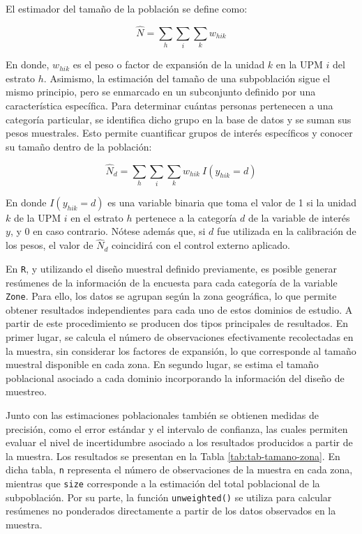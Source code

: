 \documentclass[
  spanish,
  12pt,
]{book}
\begin{document}
El estimador del tamaño de la población se define como:

\[
\hat{N} = \sum_{h} \sum_{i} \sum_{k} w_{hik}
\]

En donde, \(w_{hik}\) es el peso o factor de expansión de la unidad \(k\) en la UPM \(i\) del estrato \(h\). Asimismo, la estimación del tamaño de una subpoblación sigue el mismo principio, pero se enmarcado en un subconjunto definido por una característica específica. Para determinar cuántas personas pertenecen a una categoría particular, se identifica dicho grupo en la base de datos y se suman sus pesos muestrales. Esto permite cuantificar grupos de interés específicos y conocer su tamaño dentro de la población:

\[
\hat{N}_d = \sum_{h} \sum_{i} \sum_{k} w_{hik} \ I(y_{hik}=d)
\]

En donde \(I(y_{hik}=d)\) es una variable binaria que toma el valor de 1 si la unidad \(k\) de la UPM \(i\) en el estrato \(h\) pertenece a la categoría \(d\) de la variable de interés \(y\), y 0 en caso contrario. Nótese además que, si \(d\) fue utilizada en la calibración de los pesos, el valor de \(\hat{N}_d\) coincidirá con el control externo aplicado.

En \texttt{R}, y utilizando el diseño muestral definido previamente, es posible generar resúmenes de la información de la encuesta para cada categoría de la variable \texttt{Zone}. Para ello, los datos se agrupan según la zona geográfica, lo que permite obtener resultados independientes para cada uno de estos dominios de estudio. A partir de este procedimiento se producen dos tipos principales de resultados. En primer lugar, se calcula el número de observaciones efectivamente recolectadas en la muestra, sin considerar los factores de expansión, lo que corresponde al tamaño muestral disponible en cada zona. En segundo lugar, se estima el tamaño poblacional asociado a cada dominio incorporando la información del diseño de muestreo.

Junto con las estimaciones poblacionales también se obtienen medidas de precisión, como el error estándar y el intervalo de confianza, las cuales permiten evaluar el nivel de incertidumbre asociado a los resultados producidos a partir de la muestra. Los resultados se presentan en la Tabla \ref{tab:tab-tamano-zona}. En dicha tabla, \texttt{n} representa el número de observaciones de la muestra en cada zona, mientras que \texttt{size} corresponde a la estimación del total poblacional de la subpoblación. Por su parte, la función \texttt{unweighted()} se utiliza para calcular resúmenes no ponderados directamente a partir de los datos observados en la muestra.
\end{document}
